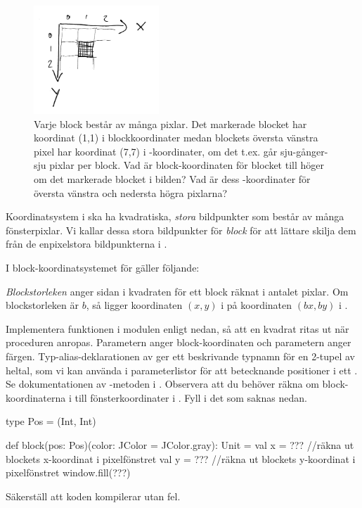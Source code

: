 \begin{figure}
\begin{center}
\includegraphics[width=0.42\textwidth]{../img/block-xy}
\end{center}
\caption{Varje block består av många pixlar. Det markerade blocket har koordinat (1,1) i blockkoordinater medan blockets översta vänstra pixel har koordinat (7,7) i -koordinater, om det t.ex. går sju-gånger-sju pixlar per block. Vad är block-koordinaten för blocket till höger om det markerade blocket i bilden? Vad är dess -koordinater för översta vänstra och nedersta högra pixlarna?}\label{lab:blockmole:coords}
\end{figure}

\Subtask
Koordinatsystem i  ska ha kvadratiska, \emph{stora} bildpunkter som består av många fönsterpixlar. 
Vi kallar dessa stora bildpunkter för \emph{block} för att lättare skilja dem från de enpixelstora bildpunkterna i . 

I block-koordinatsystemet för  gäller följande:

\begin{framed}
\noindent \emph{Blockstorleken} anger sidan i kvadraten för ett block räknat i antalet pixlar. Om blockstorleken är $b$, så ligger koordinaten $(x, y)$ i  på koordinaten $(bx, by)$ i .

\end{framed}

\noindent Implementera funktionen  i modulen  enligt nedan, så att en kvadrat ritas ut när proceduren anropas. Parametern  anger block-koordinaten och parametern  anger färgen. Typ-alias-deklarationen av  ger ett beskrivande typnamn för en 2-tupel av heltal, som vi kan använda i parameterlistor för att betecknande positioner i ett . Se dokumentationen av -metoden i . Observera att du behöver räkna om block-koordinaterna i  till fönsterkoordinater i . Fyll i det som saknas nedan.
\begin{Code}
  type Pos = (Int, Int)

  def block(pos: Pos)(color: JColor = JColor.gray): Unit = 
    val x = ??? //räkna ut blockets x-koordinat i pixelfönstret
    val y = ??? //räkna ut blockets y-koordinat i pixelfönstret
    window.fill(???)
\end{Code}
Säkerställ att koden kompilerar utan fel.

